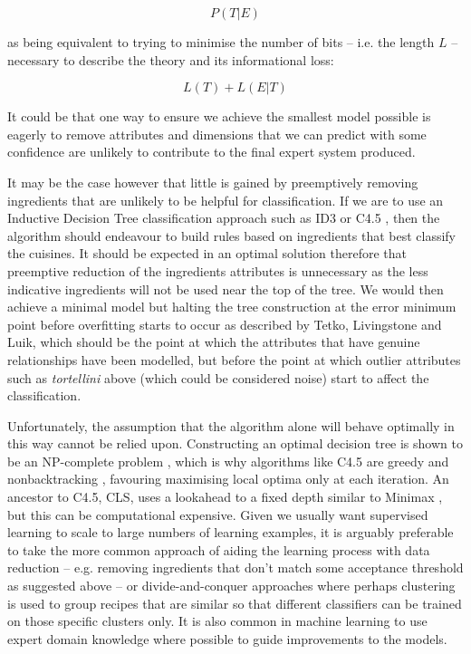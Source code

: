 \documentclass[11pt,a4paper]{article}
\begin{document}
\begin{equation}
P(T | E)
\end{equation}

\noindent as being equivalent to trying to minimise the number of bits -- i.e. the length $L$
 -- necessary to describe the theory and its informational loss:

\begin{equation}
L(T) + L(E | T)
\end{equation}

It could be that one way to ensure we achieve the smallest model possible is eagerly to remove
attributes and dimensions that we can predict with some confidence are unlikely
to contribute to the final expert system produced.

It may be the case however that little is gained by preemptively removing
ingredients that are unlikely to be helpful for classification. If we are to use an Inductive
Decision Tree classification approach such as ID3 \cite{quinlan1986induction}
or C4.5 \cite{quinlan1993c4}, then the algorithm should endeavour to build
rules based on ingredients that best classify the cuisines. It should be expected
in an optimal solution therefore that preemptive reduction of the ingredients
attributes is unnecessary as the less indicative ingredients will not be used
near the top of the tree. We would then achieve a minimal model but halting
the tree construction at the error minimum point before overfitting starts
to occur as described by Tetko, Livingstone and Luik, \cite{tetko1995neural}
which should be the point at which the attributes that have genuine relationships
have been modelled, but before the point at which outlier attributes such as
\emph{tortellini} above (which could be considered noise) start to affect the
classification.

Unfortunately, the assumption that the algorithm alone will behave optimally in this
way cannot be relied upon. Constructing an optimal decision tree is shown to be
an NP-complete problem \cite{hyafil1976constructing}, which is why algorithms
like C4.5 are greedy and nonbacktracking \cite{quinlan1993c4}, favouring
maximising local optima only at each iteration. An ancestor to C4.5, CLS,
uses a lookahead to a fixed depth similar to Minimax \cite{quinlan1986induction},
but this can be computational expensive. Given we usually want supervised
learning to scale to large numbers of learning examples, it is arguably preferable
to take the more common approach of aiding the learning process with
data reduction -- e.g. removing ingredients that don't match some acceptance threshold
as suggested above -- or divide-and-conquer approaches where perhaps clustering is
used to group recipes that are similar so that different classifiers can be
trained on those specific clusters only. It is also common in machine learning
to use expert domain knowledge where possible to guide improvements to the
models.
\end{document}
